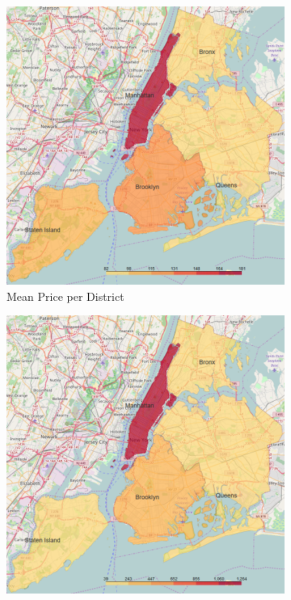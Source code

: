 \documentclass[sigconf]{acmart}
\begin{document}
\begin{figure}[!htpb]
	\centering
	\begin{subfigure}{0.5\textwidth}
		\centering
		\includegraphics[scale=0.27]{images/price_per_district}
		\caption{Mean Price per District}
		\label{fig:datadistribution:price}
	\end{subfigure}
	\hfill	
	\begin{subfigure}{0.5\textwidth}
		\centering
		\includegraphics[scale=0.27]{images/cultural_organizations_per_district}

\end{subfigure}
\end{figure}
\end{document}
